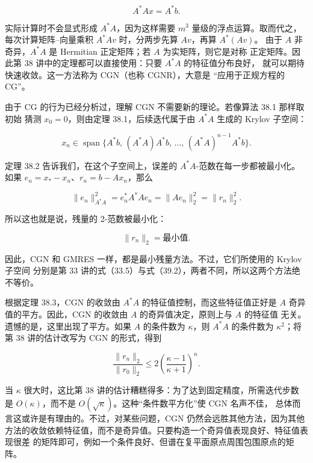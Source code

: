 \documentclass[UTF8,fontset=none,12pt]{ctexart}
\begin{document}
\begin{equation}
A^*Ax=A^*b.
\tag{39.1}
\end{equation}

实际计算时不会显式形成 $A^*A$，因为这样需要 $m^3$ 量级的浮点运算。取而代之，
每次计算矩阵--向量乘积 $A^*Av$ 时，分两步先算 $Av$，再算 $A^*(Av)$。
由于 $A$ 非奇异，$A^*A$ 是 Hermitian 正定矩阵；若 $A$ 为实矩阵，则它是对称
正定矩阵。因此第 38 讲中的定理都可以直接使用：只要 $A^*A$ 的特征值分布良好，
就可以期待快速收敛。这一方法称为 CGN（也称 CGNR），大意是
“应用于正规方程的 CG”。

由于 CG 的行为已经分析过，理解 CGN 不需要新的理论。若像算法 38.1 那样取初始
猜测 $x_0=0$，则由定理 38.1，后续迭代属于由 $A^*A$ 生成的 Krylov 子空间：

\begin{equation}
x_n\in\operatorname{span}\bigl\{
A^*b,\,(A^*A)A^*b,\,\ldots,\,(A^*A)^{n-1}A^*b
\bigr\}.
\tag{39.2}
\end{equation}

定理 38.2 告诉我们，在这个子空间上，误差的 $A^*A$-范数在每一步都被最小化。
如果 $e_n=x_* - x_n$、$r_n=b-Ax_n$，那么

\[
\lVert e_n\rVert_{A^*A}^2
=e_n^*A^*Ae_n
=\lVert Ae_n\rVert_2^2
=\lVert r_n\rVert_2^2.
\]

所以这也就是说，残量的 2-范数被最小化：

\begin{equation}
\lVert r_n\rVert_2=\text{最小值}.
\tag{39.3}
\end{equation}

因此，CGN 和 GMRES 一样，都是最小残量方法。不过，它们所使用的 Krylov 子空间
分别是第 33 讲的式（33.5）与式（39.2），两者不同，所以这两个方法绝不等价。

根据定理 38.3，CGN 的收敛由 $A^*A$ 的特征值控制，而这些特征值正好是 $A$
奇异值的平方。因此，CGN 的收敛由 $A$ 的奇异值决定，原则上与 $A$ 的特征值
无关。遗憾的是，这里出现了平方。如果 $A$ 的条件数为 $\kappa$，则 $A^*A$
的条件数为 $\kappa^2$；将第 38 讲的估计改写为 CGN 的形式，得到

\begin{equation}
\frac{\lVert r_n\rVert_2}{\lVert r_0\rVert_2}
\leq
2\left(\frac{\kappa-1}{\kappa+1}\right)^n.
\tag{39.4}
\end{equation}

当 $\kappa$ 很大时，这比第 38 讲的估计糟糕得多：为了达到固定精度，所需迭代步数
是 $O(\kappa)$，而不是 $O(\sqrt{\kappa})$。这种“条件数平方化”使 CGN 名声不佳，
总体而言这或许是有理由的。不过，对某些问题，CGN 仍然会远胜其他方法，因为其他
方法的收敛依赖特征值，而不是奇异值。只要构造一个奇异值表现良好、特征值表现很差
的矩阵即可，例如一个条件良好、但谱在复平面原点周围包围原点的矩阵。
\end{document}
